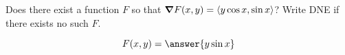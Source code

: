 \documentclass{ximera}
\author{David Guichard \and Neal Koblitz \and H. Jerome Keisler \and Albert Scheller \and Barry Balof \and Mike Wills \and Matthew Carr}
\begin{document}
\begin{exercise}




Does there exist a function $F$ so that $\boldsymbol\nabla F(x,y)=\left\langle y\cos x,\sin x\right\rangle$? Write DNE if there exists no such $F$. 

\begin{prompt}
\[
F(x,y)=\answer{y\sin x}
\]
\end{prompt}
\end{exercise}
\end{document}
